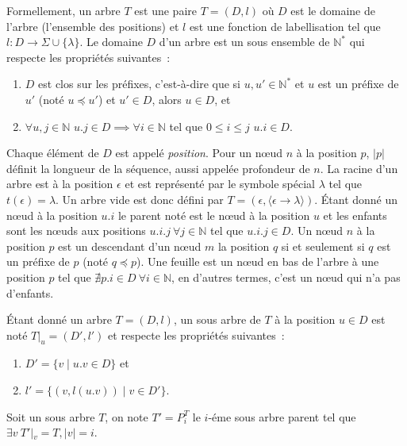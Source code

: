\begin{definition}
    Formellement, un arbre $T$ est une paire $T = (D, l)$ où $D$ est le domaine de l'arbre (l'ensemble des positions) et $l$ est une fonction de labellisation
    tel que $l : D \to \Sigma \cup \{\lambda\}$.
    Le domaine $D$ d'un arbre est un sous ensemble de $\mathbb{N}^*$ qui respecte les propriétés suivantes :
    \begin{enumerate}
        \item $D$ est clos sur les préfixes, c'est-à-dire que si $u, u' \in \mathbb{N}^*$ et $u$ est un préfixe de $u'$ (noté $u \preceq u'$) et $u' \in D$, alors $u \in D$, et
        \item $\forall u, j \in \mathbb{N}$ $u.j \in D \implies \forall i \in \mathbb{N}$ tel que $0 \leq i \leq j$ $ u.i \in D$.
    \end{enumerate}
    Chaque élément de $D$ est appelé \emph{position}.
    Pour un nœud $n$ à la position $p$, $|p|$ définit la longueur de la séquence, aussi appelée profondeur de $n$.
    La racine d'un arbre est à la position $\epsilon$ et est représenté par le symbole spécial $\lambda$ tel que $t(\epsilon) = \lambda$.
    Un arbre vide est donc défini par  $T = (\epsilon, \langle \epsilon \to \lambda \rangle)$.
    Étant donné un nœud à la position $u.i$ le parent noté est le nœud à la position $u$ et les enfants sont les nœuds aux positions $u.i.j ~ \forall j \in \mathbb{N}$ tel que $u.i.j \in D$.
    Un nœud $n$ à la position $p$ est un descendant d'un nœud $m$ la position $q$ si et seulement si $q$ est un préfixe de $p$ (noté $q \preceq p$).
    Une feuille est un nœud en bas de l'arbre à une position $p$ tel que $\nexists p.i \in D ~ \forall i \in \mathbb{N}$, en d'autres termes, c'est un nœud qui n'a pas d'enfants.
\end{definition}

\begin{definition}
    Étant donné un arbre $T = (D, l)$, un sous arbre de $T$ à la position $u \in D$ est noté $T|_u = (D', l')$ et respecte les propriétés suivantes :
    \begin{enumerate}
        \item $D' = \{v \mid u.v \in D\}$ et
        \item $l' = \{(v, l(u.v)) \mid v \in D'\}$.
    \end{enumerate}
    Soit un sous arbre $T$, on note $T' = P_i^T$ le $i$-éme sous arbre parent tel que $\exists v ~ T'|_v = T, |v| = i$.
\end{definition}

